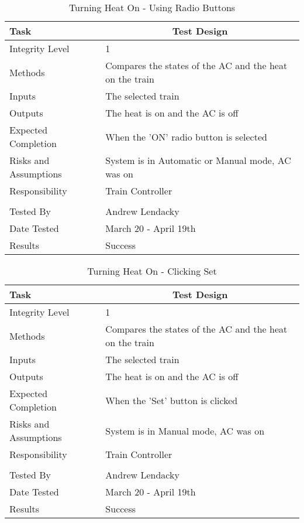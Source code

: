 \documentclass[]{article}
\begin{document}
\begin{table}[H]
	\centering
	\caption{Turning Heat On - Using Radio Buttons}
	\begin{tabular}{|l|l|}
		\hline
		Task & \multicolumn{1}{c|}{Test Design} \\ \hline
		Integrity Level & 1 \\ \hline
		Methods & Compares the states of the AC and the heat on the train\\ \hline
		Inputs & The selected train\\ \hline
		Outputs & The heat is on and the AC is off\\ \hline
		Expected Completion & When the 'ON' radio button is selected\\ \hline
		Risks and Assumptions & System is in Automatic or Manual mode, AC was on \\ \hline
		Responsibility &  Train Controller\\ \hline
			\\ \hline
		Tested By   &  Andrew Lendacky\\	\hline
		Date Tested & \parbox[t]{10cm}{March 20 - April 19th}\\ \hline
		Results & Success\\ \hline
	\end{tabular}
\end{table}

\begin{table}[H]
	\centering
	\caption{Turning Heat On - Clicking Set}
	\begin{tabular}{|l|l|}
		\hline
		Task & \multicolumn{1}{c|}{Test Design} \\ \hline
		Integrity Level & 1 \\ \hline
		Methods & Compares the states of the AC and the heat on the train\\ \hline
		Inputs & The selected train\\ \hline
		Outputs & The heat is on and the AC is off \\ \hline
		Expected Completion & When the 'Set' button is clicked\\ \hline
		Risks and Assumptions & System is in Manual mode, AC was on \\ \hline
		Responsibility &  Train Controller\\ \hline
			\\ \hline
		Tested By   &  Andrew Lendacky\\	\hline
		Date Tested & \parbox[t]{10cm}{March 20 - April 19th}\\ \hline
		Results & Success\\ \hline
	\end{tabular}
\end{table}
\end{document}
